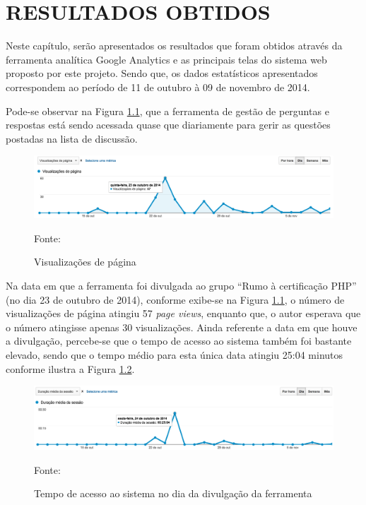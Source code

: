 \chapter{RESULTADOS OBTIDOS}
\label{chp:resultadosObtidos}
 
Neste capítulo, serão apresentados os resultados que foram obtidos através da
ferramenta analítica \acs{Google Analytics} e as principais telas do sistema
web proposto por este projeto. Sendo que, os dados estatísticos apresentados
correspondem ao período de 11 de outubro à 09 de novembro de 2014.

Pode-se observar na Figura \ref{fig:googleAnalyticsGrafico}, que a
ferramenta de gestão de perguntas e respostas está sendo acessada quase
que diariamente para gerir as questões postadas na lista de discussão.

\begin{figure}[h!tb]
	\caption{Visualizações de página}
	\label{fig:googleAnalyticsGrafico}

	\centering
	\includegraphics[width=\textwidth]{images/resultados/google-analytics-grafico.png}

	\centering
	\footnotesize Fonte: \fonteOAutor
\end{figure}

\FloatBarrier 	%

Na data em que a ferramenta foi divulgada ao grupo ``Rumo à certificação PHP''
(no dia 23 de outubro de 2014), conforme exibe-se na Figura
\ref{fig:googleAnalyticsGrafico}, o número de visualizações de página atingiu 
57 \textit{page views}, enquanto que, o autor esperava que o número atingisse
apenas 30 visualizações. Ainda referente a data em que houve a divulgação, 
percebe-se que o tempo de acesso ao sistema também foi bastante elevado, sendo
que o tempo médio para esta única data atingiu 25:04 minutos conforme ilustra a 
Figura \ref{fig:googleAnalyticsTempoAcessoDivulgacao}.

\begin{figure}[h!tb]
	\caption{Tempo de acesso ao sistema no dia da divulgação da ferramenta}
	\label{fig:googleAnalyticsTempoAcessoDivulgacao}

	\centering
	\includegraphics[width=\textwidth]{images/resultados/google-analytics-tempoacesso-divulgacao.png}

	\centering
	\footnotesize Fonte: \fonteOAutor
\end{figure}

